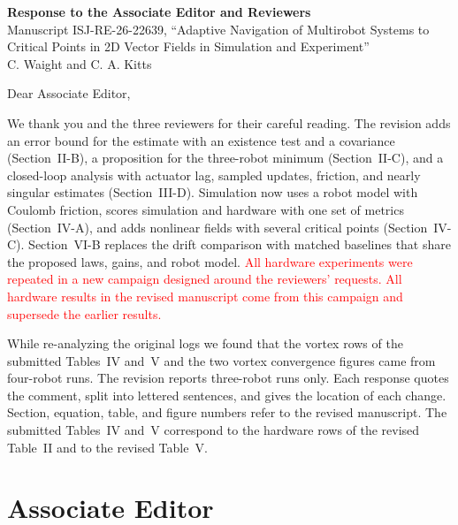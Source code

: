 \documentclass[10pt]{article}
\newcommand{\syn}[1]{\textcolor{red}{#1}}            %
\begin{document}
\begin{center}
{\large\bfseries Response to the Associate Editor and Reviewers}\\[3pt]
Manuscript ISJ-RE-26-22639, ``Adaptive Navigation of Multirobot Systems to Critical Points in 2D Vector Fields in Simulation and Experiment''\\[2pt]
C. Waight and C. A. Kitts
\end{center}

Dear Associate Editor,

We thank you and the three reviewers for their careful reading. The revision adds an error bound for the estimate with an existence test and a covariance (Section~II-B), a proposition for the three-robot minimum (Section~II-C), and a closed-loop analysis with actuator lag, sampled updates, friction, and nearly singular estimates (Section~III-D). Simulation now uses a robot model with Coulomb friction, scores simulation and hardware with one set of metrics (Section~IV-A), and adds nonlinear fields with several critical points (Section~IV-C). Section~VI-B replaces the drift comparison with matched baselines that share the proposed laws, gains, and robot model. \syn{All hardware experiments were repeated in a new campaign designed around the reviewers' requests. All hardware results in the revised manuscript come from this campaign and supersede the earlier results.}

While re-analyzing the original logs we found that the vortex rows of the submitted Tables~IV and~V and the two vortex convergence figures came from four-robot runs. The revision reports three-robot runs only. Each response quotes the comment, split into lettered sentences, and gives the location of each change. Section, equation, table, and figure numbers refer to the revised manuscript. The submitted Tables~IV and~V correspond to the hardware rows of the revised Table~II and to the revised Table~V.


\section*{Associate Editor}
\end{document}
